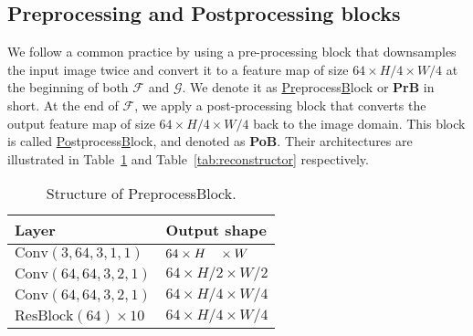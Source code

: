 \documentclass[final]{cvpr}
\newcommand{\Tref}[1]{Table~\ref{#1}}
\begin{document}
\subsection{Preprocessing and Postprocessing blocks}
We follow a common practice by using a pre-processing block that downsamples the input image twice and convert it to a feature map of size $64 \times H/4 \times W/4$ at the beginning of both $\mathcal{F}$ and $\mathcal{G}$. We denote it as \underline{Pr}eprocess\underline{B}lock or \textbf{PrB} in short. At the end of $\mathcal{F}$, we apply a post-processing block that converts the output feature map of size $64 \times H/4 \times W/4$ back to the image domain. This block is called \underline{Po}stprocess\underline{B}lock, and denoted as \textbf{PoB}.
Their architectures are illustrated in \Tref{tab:kernel_extractor} and \Tref{tab:reconstructor} respectively.


\begin{table}[ht]
    \setlength{\tabcolsep}{6pt}
    \centering
    \begin{tabular}{ll}
        \toprule
        Layer                                    &  Output shape\\
        \midrule
        $\text{Conv}(3, 64, 3, 1, 1)$            &  $64 \times H \hphantom{/1} \times W$\\
        $\text{Conv}(64, 64, 3, 2, 1)$           &  $64 \times H/2 \times W/2$\\
        $\text{Conv}(64, 64, 3, 2, 1)$           &  $64 \times H/4 \times W/4$\\
        $\text{ResBlock}(64) \times 10$          &  $64 \times H/4 \times W/4$\\
        \bottomrule
    \end{tabular}
    \caption{Structure of PreprocessBlock.}
    \label{tab:kernel_extractor}
\end{table}
\end{document}
